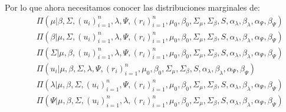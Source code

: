 Por lo que ahora necesitamos conocer las distribuciones marginales de:
\begin{eqnarray*}
& &\Pi(\mu|\beta,\Sigma,(u_{i})_{i=1}^{n},\lambda,\Psi,(r_{i})_{i=1}^{n},\mu_{0},\beta_{0},\Sigma_{\mu},\Sigma_{\beta},S,\alpha_{\lambda},\beta_{\lambda},\alpha_{\Psi},\beta_{\Psi}) \\
& & \Pi(\beta|\mu,\Sigma,(u_{i})_{i=1}^{n},\lambda,\Psi,(r_{i})_{i=1}^{n},\mu_{0},\beta_{0},\Sigma_{\mu},\Sigma_{\beta},S,\alpha_{\lambda},\beta_{\lambda},\alpha_{\Psi},\beta_{\Psi}) \\
& &\Pi(\Sigma|\mu,\beta,(u_{i})_{i=1}^{n},\lambda,\Psi,(r_{i})_{i=1}^{n},\mu_{0},\beta_{0},\Sigma_{\mu},\Sigma_{\beta},S,\alpha_{\lambda},\beta_{\lambda},\alpha_{\Psi},\beta_{\Psi}) \\
& & \Pi(u_{i}|\mu,\beta,\Sigma,\lambda,\Psi,(r_{i})_{i=1}^{n},\mu_{0},\beta_{0},\Sigma_{\mu},\Sigma_{\beta},S,\alpha_{\lambda},\beta_{\lambda},\alpha_{\Psi},\beta_{\Psi})\\
& & \Pi(\lambda|\mu,\beta,\Sigma,(u_{i})_{i=1}^{n},\Psi,(r_{i})_{i=1}^{n},\mu_{0},\beta_{0},\Sigma_{\mu},\Sigma_{\beta},S,\alpha_{\lambda},\beta_{\lambda},\alpha_{\Psi},\beta_{\Psi}) \\
& &\Pi(\Psi|\mu,\beta,\Sigma,(u_{i})_{i=1}^{n},\lambda,(r_{i})_{i=1}^{n},\mu_{0},\beta_{0},\Sigma_{\mu},\Sigma_{\beta},S,\alpha_{\lambda},\beta_{\lambda},\alpha_{\Psi},\beta_{\Psi})\\
\end{eqnarray*}




